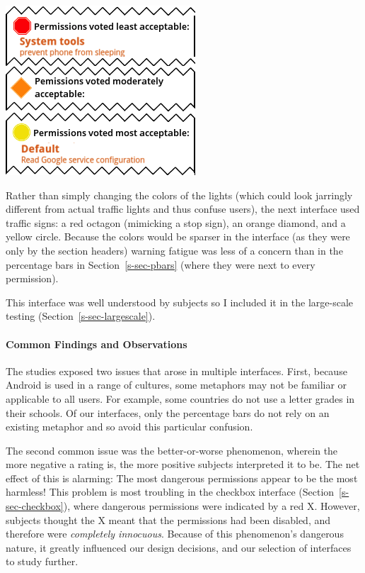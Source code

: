 \documentclass[11pt]{article}
\newcommand{\refsec}[1]{Section~\ref{#1}}
\begin{document}
\label{ss-sec-traffic-r4}
\begin{center}
\includegraphics[width=.5\linewidth]{candidate-img/traffic/trafficR4.png}
\end{center}

Rather than simply changing the colors of
the lights (which  
could look jarringly different from actual traffic lights and thus confuse users), 
the next interface used traffic signs: a red octagon
(mimicking a stop sign), an orange diamond, and a yellow circle. 
Because the colors would be sparser in the interface (as they were only by the section 
headers) warning fatigue was less of
a concern than in the percentage bars in \refsec{s-sec-pbars} 
(where they were next to every permission). 

This interface was well understood by subjects so I included it
in the large-scale testing (\refsec{s-sec-largescale}).


\paragraph{Common Findings and Observations}
\label{common-findings}

The studies exposed two issues that arose in multiple 
interfaces. First, because Android is used in a range of 
cultures, some metaphors may not be familiar or applicable to all users.
For example, some countries 
do not use a letter grades in their schools.
Of our
interfaces, only the percentage bars do 
not rely on an existing metaphor and so avoid this particular confusion.

The second common issue was the better-or-worse phenomenon, 
wherein the more negative a rating is, the more positive subjects interpreted 
it to be. The net effect of this is alarming: The most dangerous permissions 
appear to be the most harmless! This problem is 
most troubling in the checkbox interface (\refsec{s-sec-checkbox}),
where dangerous permissions were indicated by a red X. However, 
subjects thought the X meant that the permissions had been disabled, and therefore 
were \emph{completely innocuous}. Because of this phenomenon's dangerous nature, it greatly 
influenced our design decisions, and our selection of interfaces to study further.
\end{document}
